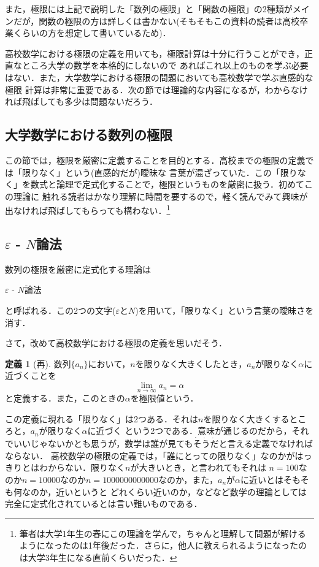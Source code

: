 \documentclass[a4paper,12pt,autodetect-engine,dvipdfmx]{jsarticle}
\theoremstyle{definition}
\newtheorem{dfn}{定義}[section]
\begin{document}
また，極限には上記で説明した「数列の極限」と「関数の極限」の2種類がメインだが，関数の極限の方は詳しくは書かない(そもそもこの資料の読者は高校卒業くらいの方を想定して書いているため)．

高校数学における極限の定義を用いても，極限計算は十分に行うことができ，正直なところ大学の数学を本格的にしないので
あればこれ以上のものを学ぶ必要はない．また，大学数学における極限の問題においても高校数学で学ぶ直感的な極限
計算は非常に重要である．次の節では理論的な内容になるが，わからなければ飛ばしても多少は問題ないだろう．
\subsection{大学数学における数列の極限}
この節では，極限を厳密に定義することを目的とする．高校までの極限の定義では「限りなく」という(直感的だが)曖昧な
言葉が混ざっていた．この「限りなく」を数式と論理で定式化することで，極限というものを厳密に扱う．初めてこの理論に
触れる読者はかなり理解に時間を要するので，軽く読んでみて興味が出なければ飛ばしてもらっても構わない．\footnote{筆者は大学1年生の春にこの理論を学んで，ちゃんと理解して問題が解けるようになったのは1年後だった．さらに，他人に教えられるようになったのは大学3年生になる直前くらいだった．}
\subsection{$\varepsilon$ - $N$論法}
数列の極限を厳密に定式化する理論は
\begin{center}
    $\varepsilon$ - $N$論法
\end{center}
と呼ばれる．この2つの文字($\varepsilon$と$N$)を用いて，「限りなく」という言葉の曖昧さを消す．

さて，改めて高校数学における極限の定義を思いだそう．
\begin{dfn}[再]
    数列$\{a_{n}\}$において，$n$を限りなく大きくしたとき，$a_{n}$が限りなく$\alpha$に近づくことを
    \begin{equation*}
        \lim_{n \to \infty}a_{n} = \alpha
    \end{equation*}
と定義する．また，このときの$\alpha$を極限値という．
\end{dfn}
この定義に現れる「限りなく」は2つある．それは$n$を限りなく大きくするところと，$a_{n}$が限りなく$\alpha$に近づく
という2つである．意味が通じるのだから，それでいいじゃないかとも思うが，数学は誰が見ても$\dot{そ}\dot{う}\dot{だ}$と言える定義でなければならない．
高校数学の極限の定義では，「誰にとっての限りなく」なのかがはっきりとはわからない．限りなく$n$が大きいとき，と言われてもそれは
$n=100$なのか$n=10000$なのか$n=1000000000000$なのか，また，$a_{n}$が$\alpha$に近いとはそもそも何なのか，近いというと
どれくらい近いのか，などなど数学の理論としては完全に定式化されているとは言い難いものである．
\end{document}
